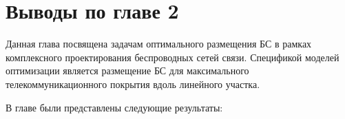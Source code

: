 
\section{Выводы по главе 2}
Данная глава посвящена задачам оптимального размещения БС в рамках комплексного проектирования беспроводных сетей связи. 
Спецификой моделей оптимизации является размещение БС для максимального телекоммуникационного покрытия вдоль линейного участка.

В главе были представлены следующие результаты:

